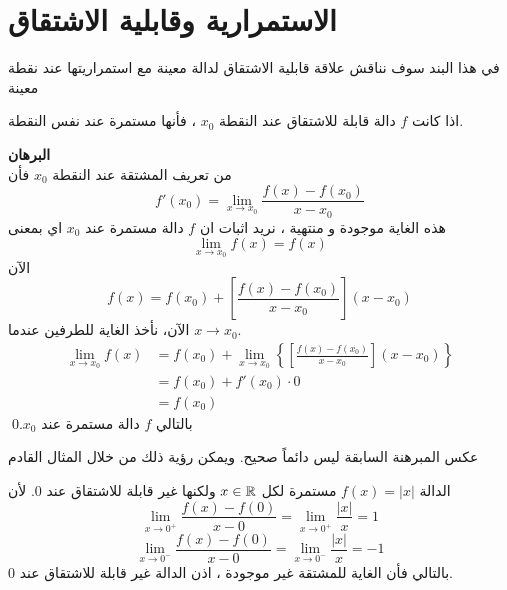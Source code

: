 \section[الاستمرارية وقابلية الاشتقاق]{الاستمرارية وقابلية الاشتقاق \cite{introrealanal}}

في هذا البند سوف نناقش علاقة قابلية الاشتقاق لدالة معينة مع استمراريتها عند نقطة معينة
\begin{theorem}
	اذا كانت $f$ دالة قابلة للاشتقاق عند النقطة $x_0 $ ، فأنها مستمرة عند نفس النقطة.
\end{theorem} 
\noindent
\textbf{البرهان}\\
\noindent
من تعريف المشتقة عند النقطة $x_0 $ فأن 
\[
f'(x_0) = \lim\limits_{x\to x_0} \frac{f(x) - f(x_0 )}{x-x_0}
\]
هذه الغاية موجودة و منتهية ، نريد اثبات ان $f$ دالة مستمرة عند $x_0 $ اي بمعنى 
\[
\lim\limits_{x\to x_0} f(x) = f(x)
\]
الآن 
\[
f(x) = f(x_0) + \left[\frac{f(x) - f(x_0)}{x-x_0}\right] (x-x_0)
\]
الآن، نأخذ الغاية للطرفين عندما $x\to x_0 $.
\begin{align*}
\lim\limits_{x\to  x_0}f(x) &= f(x_0) + \lim\limits_{x\to x_0}
\left\{
\left[\frac{f(x) - f(x_0)}{x-x_0}\right] (x-x_0)
\right\}\\
&= f(x_0 ) + f'(x_0) \cdot 0\\
&= f(x_0)
\end{align*}
بالتالي $f$ دالة مستمرة عند $x_0$.\qed

\begin{note}
	عكس المبرهنة السابقة ليس دائماً صحيح. ويمكن رؤية ذلك من خلال المثال القادم
\end{note}

\begin{example}
	الدالة $f(x) = |x|$ مستمرة لكل $x\in\mathbb{R}$ ولكنها غير قابلة للاشتقاق عند 0. لأن 
	\[
	\lim\limits_{x\to 0^+} \frac{f(x) - f(0)}{x-0} = \lim\limits_{x\to 0^+} \frac{|x|}{x} = 1
	\]  
	\[
		\lim\limits_{x\to 0^-} \frac{f(x) - f(0)}{x-0} = \lim\limits_{x\to 0^-} \frac{|x|}{x} = -1
	\]
	بالتالي فأن الغاية للمشتقة غير موجودة ، اذن الدالة غير قابلة للاشتقاق عند 0.
	
	\begin{figure}[H]
		\centering
		\caption{}
	\end{figure}
\end{example}

